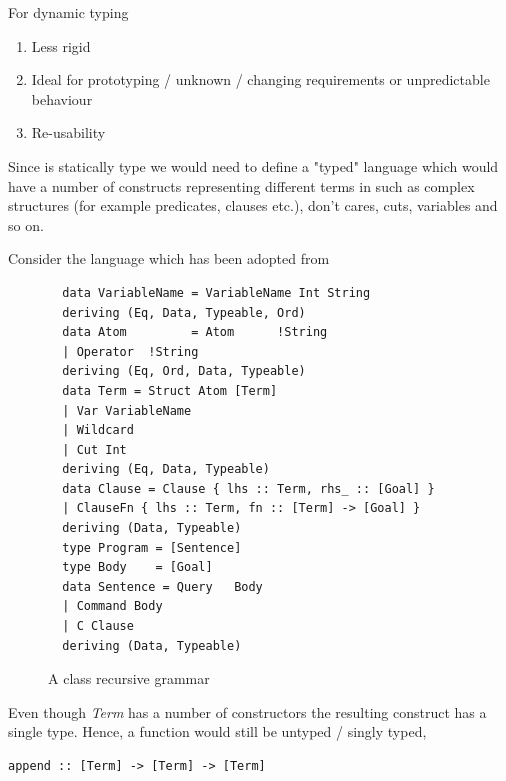 \documentclass[thesis-solanki.tex]{subfiles}
\begin{document}
For dynamic typing
\begin{enumerate}
\item Less rigid
\item Ideal for prototyping / unknown / changing requirements or unpredictable behaviour 
\item Re-usability  
\end{enumerate}

Since  is statically type we would need to define a "typed" language which would have a
number of constructs representing different terms in  such as complex structures (for example
predicates, clauses etc.), don't cares, cuts, variables and so on.

Consider the language  which has been adopted from
\cite{prolog-lib}

\begin{figure}
\begin{verbatim}	
  data VariableName = VariableName Int String
  deriving (Eq, Data, Typeable, Ord)
  data Atom         = Atom      !String
  | Operator  !String
  deriving (Eq, Ord, Data, Typeable)
  data Term = Struct Atom [Term]
  | Var VariableName
  | Wildcard
  | Cut Int
  deriving (Eq, Data, Typeable)
  data Clause = Clause { lhs :: Term, rhs_ :: [Goal] }
  | ClauseFn { lhs :: Term, fn :: [Term] -> [Goal] }
  deriving (Data, Typeable)
  type Program = [Sentence]
  type Body    = [Goal]
  data Sentence = Query   Body
  | Command Body
  | C Clause
  deriving (Data, Typeable)
\end{verbatim}
  \caption{A class recursive grammar}
  \label{tab:closed-terms}
\end{figure}

Even though \textit{Term} has a number of constructors the resulting construct has a single type. Hence, a function would still be untyped 
/ singly typed,\par
\begin{verbatim}
append :: [Term] -> [Term] -> [Term]
\end{verbatim} 

\end{document}
